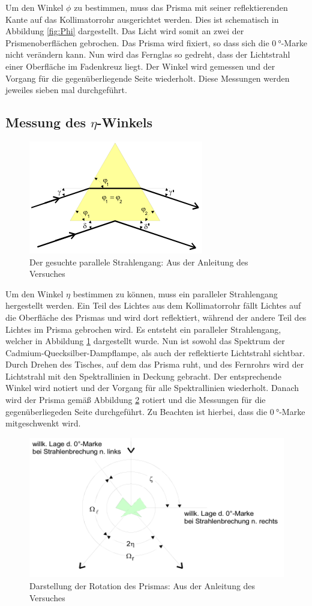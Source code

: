 Um den Winkel $\phi$ zu bestimmen, muss das Prisma mit seiner reflektierenden Kante auf das Kollimatorrohr ausgerichtet werden.
Dies ist schematisch in Abbildung \ref{fig:Phi} dargestellt.
Das Licht wird somit an zwei der Prismenoberflächen gebrochen.
Das Prisma wird fixiert, so dass sich die $\SI{0}{\degree}$-Marke nicht verändern kann.
Nun wird das Fernglas so gedreht, dass der Lichtstrahl einer Oberfläche im Fadenkreuz liegt.
Der Winkel wird gemessen und der Vorgang für die gegenüberliegende Seite wiederholt.
Diese Messungen werden jeweiles sieben mal durchgeführt.

\subsection{Messung des \texorpdfstring{$\eta$}{eta}-Winkels}

\begin{figure}
  \centering
  \includegraphics[scale=0.6]{images/Eta.png}
  \caption{Der gesuchte parallele Strahlengang: Aus der Anleitung des Versuches \cite[26]{1}}
  \label{fig:Eta}
\end{figure}

Um den Winkel $\eta$ bestimmen zu können, muss ein paralleler Strahlengang hergestellt werden.
Ein Teil des Lichtes aus dem Kollimatorrohr fällt Lichtes auf die Oberfläche des Prismas und wird dort reflektiert, während der andere Teil des Lichtes im Prisma gebrochen wird.
Es entsteht ein paralleler Strahlengang, welcher in Abbildung \ref{fig:Eta} dargestellt wurde.
Nun ist sowohl das Spektrum der Cadmium-Quecksilber-Dampflampe, als auch der reflektierte Lichtstrahl sichtbar.
Durch Drehen des Tisches, auf dem das Prisma ruht, und des Fernrohrs wird der Lichtstrahl mit den Spektrallinien in Deckung gebracht.
Der entsprechende Winkel wird notiert und der Vorgang für alle Spektrallinien wiederholt.
Danach wird der Prisma gemäß Abbildung \ref{fig:Drehung} rotiert und die Messungen für die gegenüberliegeden Seite durchgeführt.
Zu Beachten ist hierbei, dass die $\SI{0}{\degree}$-Marke mitgeschwenkt wird.

\begin{figure}
  \centering
  \includegraphics[scale=0.6]{images/Drehung.png}
  \caption{Darstellung der Rotation des Prismas: Aus der Anleitung des Versuches \cite[25]{1}}
  \label{fig:Drehung}
\end{figure}
